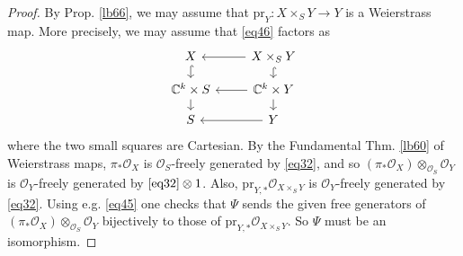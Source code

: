 \documentclass[12pt,b5paper,notitlepage]{report}
\theoremstyle{definition}
\theoremstyle{plain}
\newcommand{\scr}{\mathscr}
\newcommand{\Cbb}{\mathbb C}
\newcommand{\pr}{\mathrm {pr}}
\numberwithin{equation}{section}
\begin{document}
\begin{proof}
By Prop. \ref{lb66}, we may assume that $\pr_Y:X\times_SY\rightarrow Y$ is a Weierstrass map. More precisely, we may assume that \eqref{eq46} factors as
\begin{equation*}
\begin{tikzcd}[row sep=small]
X \arrow[d, hook]        & X\times_SY \arrow[l] \arrow[d, hook] \\
\Cbb^k\times S \arrow[d] & \Cbb^k\times Y \arrow[l] \arrow[d]   \\
S                        & Y \arrow[l]               
\end{tikzcd}
\end{equation*}
where the two small squares are Cartesian. By the Fundamental Thm. \ref{lb60} of Weierstrass maps, $\pi_*\scr O_X$ is $\scr O_S$-freely generated by \eqref{eq32}, and so $(\pi_*\scr O_X)\otimes_{\scr O_S}\scr O_Y$ is $\scr O_Y$-freely generated by  $\eqref{eq32}\otimes 1$. Also, $\pr_{Y,*}\scr O_{X\times_SY}$ is $\scr O_Y$-freely generated by \eqref{eq32}. Using e.g. \eqref{eq45} one checks that $\Psi$ sends the given free generators of $(\pi_*\scr O_X)\otimes_{\scr O_S}\scr O_Y$ bijectively to those of $\pr_{Y,*}\scr O_{X\times_SY}$. So $\Psi$ must be an isomorphism.
\end{proof}
\end{document}
